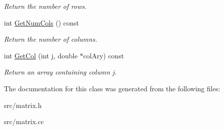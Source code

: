 \begin{DoxyCompactItemize}
\begin{DoxyCompactList}\small\item\em Return the number of rows. \item\end{DoxyCompactList}\item 
\hypertarget{classMatrix_a4069e97fcef57fce6828c6042d63e7d2}{
int \hyperlink{classMatrix_a4069e97fcef57fce6828c6042d63e7d2}{GetNumCols} () const }
\label{d3/d3f/classMatrix_a4069e97fcef57fce6828c6042d63e7d2}

\begin{DoxyCompactList}\small\item\em Return the number of columns. \item\end{DoxyCompactList}\item 
\hypertarget{classMatrix_a830c8a78828c4db552648e46aef5ec6e}{
int \hyperlink{classMatrix_a830c8a78828c4db552648e46aef5ec6e}{GetCol} (int j, double $\ast$colAry) const }
\label{d3/d3f/classMatrix_a830c8a78828c4db552648e46aef5ec6e}

\begin{DoxyCompactList}\small\item\em Return an array containing column j. \item\end{DoxyCompactList}\end{DoxyCompactItemize}


The documentation for this class was generated from the following files:\begin{DoxyCompactItemize}
\item 
src/matrix.h\item 
src/matrix.cc\end{DoxyCompactItemize}

